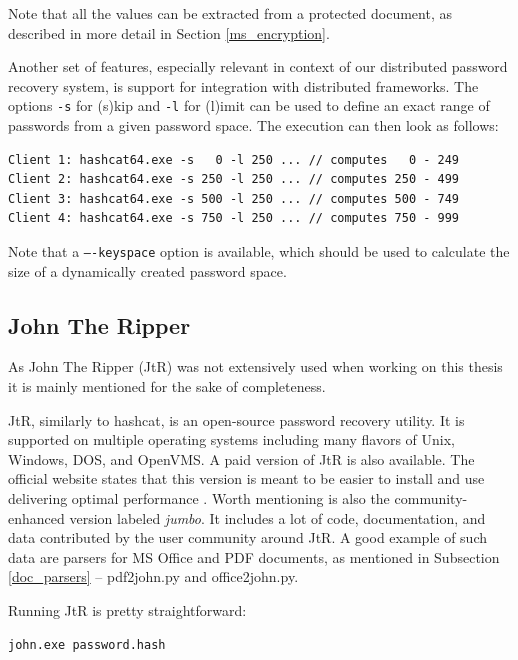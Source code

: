 \documentclass[11pt,oneside]{fithesis2}
\begin{document}
Note that all the values can be extracted from a protected document, as described in more detail in Section \ref{ms_encryption}.

Another set of features, especially relevant in context of our distributed password recovery system, is support for integration with distributed frameworks. The options \texttt{-s} for (s)kip and \texttt{-l} for (l)imit can be used to define an exact range of passwords from a given password space. The execution can then look as follows:

\begin{lstlisting}
Client 1: hashcat64.exe -s   0 -l 250 ... // computes   0 - 249
Client 2: hashcat64.exe -s 250 -l 250 ... // computes 250 - 499
Client 3: hashcat64.exe -s 500 -l 250 ... // computes 500 - 749
Client 4: hashcat64.exe -s 750 -l 250 ... // computes 750 - 999
\end{lstlisting}

Note that a \texttt{----keyspace} option is available, which should be used to calculate the size of a dynamically created password space. 

\subsection{John The Ripper}

As John The Ripper (JtR) was not extensively used when working on this thesis it is mainly mentioned for the sake of completeness.

JtR, similarly to hashcat, is an open-source password recovery utility. It is supported on multiple operating systems including many flavors of Unix, Windows, DOS, and OpenVMS. A paid version of JtR is also available. The official website states that this version is meant to be easier to install and use delivering optimal performance \cite{jtr}. Worth mentioning is also the community-enhanced version labeled \textit{jumbo}. It includes a lot of code, documentation, and data contributed by the user community around JtR. A good example of such data are parsers for MS Office and PDF documents, as mentioned in Subsection \ref{doc_parsers} -- pdf2john.py and  office2john.py.

Running JtR is pretty straightforward:

\begin{lstlisting}
john.exe password.hash
\end{lstlisting}
\end{document}
